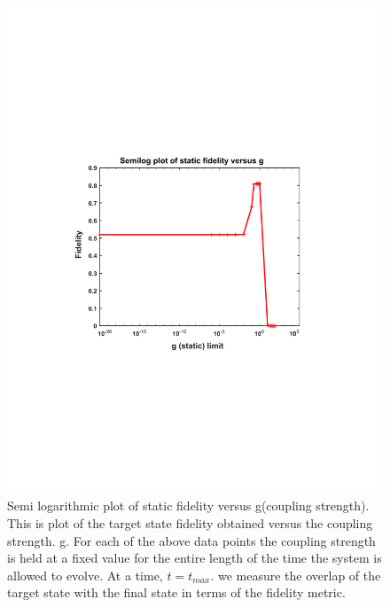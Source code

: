 \begin{center}
\begin{figure}%
\includegraphics[width=1.1\textwidth]{A_fidelity_static_g__semilog_large_range}
\caption{Semi logarithmic plot of static fidelity versus g(coupling strength). This is plot of the target state fidelity obtained versus the coupling strength. g. For each of the above data points the coupling strength is held at a fixed value for the entire length of the time the system is allowed to evolve. At a time, $t = t_{max}$. we measure the overlap of the target state with the final state in terms of the fidelity metric.}
\label{A_fidelity_static_g__semilog_large_range}
\end{figure}
\end{center}



